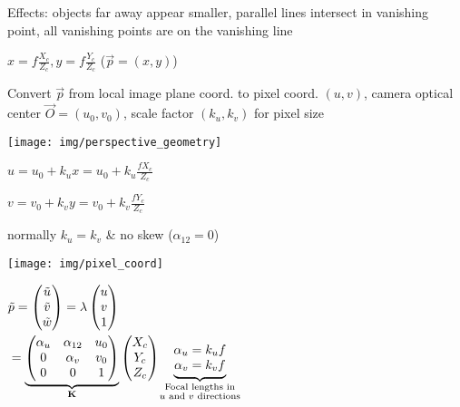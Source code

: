 \documentclass[fontsize=6pt]{scrartcl}
\newcommand{\mat}[1]{\mathbf{#1}}
\begin{document}
\begin{multicols*}{4}
Effects: objects far away appear smaller, parallel lines intersect in vanishing point, all vanishing points are on the vanishing line


$x = f \frac{X_c}{Z_c}, y = f \frac{Y_c}{Z_c}$ ($\vec p = (x,y)$)

Convert $\vec{p}$ from local image plane coord. to pixel coord. $(u,v)$, camera optical center $\vec{O} = (u_0,v_0)$, scale factor $(k_u, k_v)$ for pixel size

\begin{minipage}{0.45\linewidth}
	\texttt{[image: img/perspective\_geometry]}
\end{minipage}
\begin{minipage}{0.55\linewidth}

	
	$u = u_0 + k_u x = u_0 + k_u \frac{fX_c}{Z_c}$
	
	$v = v_0 + k_v y = v_0 + k_v \frac{fY_c}{Z_c}$
	
	normally $k_u = k_v$ \& no skew ($\alpha_{12} = 0$)
\end{minipage}

\begin{minipage}{0.35\linewidth}
	\texttt{[image: img/pixel\_coord]}
\end{minipage}
\begin{minipage}{0.65\linewidth}	
	$
	\begin{aligned}
	&\tilde{p}
	=
	\begin{pmatrix}
	\tilde{u}\\
	\tilde{v}\\
	\tilde{w}\\
	\end{pmatrix}
	=
	\lambda
	\begin{pmatrix}
	u\\
	v\\
	1\\
	\end{pmatrix}
	\\
	&= 
	\underbrace{
	\begin{pmatrix}
	\alpha_u & \alpha_{12} & u_0\\
	0 & \alpha_v & v_0\\
	0 & 0 & 1
	\end{pmatrix}
	}_{\mat K}
	\begin{pmatrix}
	X_c\\
	Y_c\\
	Z_c
	\end{pmatrix}
	\quad
	\underbrace{
	\begin{matrix}
	\alpha_u = k_u f\\
	\alpha_v = k_v f\\
	\end{matrix}
	}_{\mathclap{\substack{\text{Focal lengths in}\\ \text{$u$ and $v$ directions}}}}
	\end{aligned}
	$
\end{minipage}


\end{multicols*}
\end{document}
